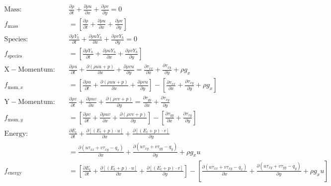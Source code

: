 \documentclass{homework}
\begin{document}
{\footnotesize \begin{align*}
    \mathrm{Mass:} \quad &\frac{\partial \rho}{\partial t} + \frac{\partial \rho u}{\partial x} + \frac{\partial \rho v}{\partial y} = 0 \\
    f_\mathrm{mass} &= \left[ \tfrac{\partial \rho}{\partial t} + \tfrac{\partial \rho u}{\partial x} + \tfrac{\partial \rho v}{\partial y} \right] \\
    \mathrm{Species:} \quad &\frac{\partial \rho Y_h}{\partial t} + \frac{\partial \rho u Y_h}{\partial x} + \frac{\partial \rho v Y_h}{\partial y} = 0 \\
    f_\mathrm{species} &= \left[ \tfrac{\partial \rho Y_h}{\partial t} + \tfrac{\partial \rho u Y_h}{\partial x} + \tfrac{\partial \rho v Y_h}{\partial y} \right] \\
    \mathrm{X-Momentum:} \quad &\frac{\partial \rho u}{\partial t} + \frac{\partial (\rho u u + p)}{\partial x} + \frac{\partial \rho v u}{\partial y} = \frac{ \partial \tau_{xx}}{\partial x} + \frac{ \partial \tau_{xy}}{\partial y} + \rho g_x \\
    f_{\mathrm{mom},x} &= \left[ \tfrac{\partial \rho u}{\partial t} + \tfrac{\partial (\rho u u + p)}{\partial x} + \tfrac{\partial \rho v u}{\partial y} \right] - \left[ \tfrac{ \partial \tau_{xx}}{\partial x} + \tfrac{ \partial \tau_{xy}}{\partial y} + \rho g_x \right] \\
    \mathrm{Y-Momentum:} \quad &\frac{\partial \rho v}{\partial t} + \frac{\partial \rho u v}{\partial x} + \frac{\partial (\rho v v + p)}{\partial y} = \frac{ \partial \tau_{yy}}{\partial x} + \frac{ \partial \tau_{xy}}{\partial y} \\
    f_{\mathrm{mom},y} &= \left[ \tfrac{\partial \rho v}{\partial t} + \tfrac{\partial \rho u v}{\partial x} + \tfrac{\partial (\rho v v + p)}{\partial y} \right] - \left[ \tfrac{ \partial \tau_{yy}}{\partial x} + \tfrac{ \partial \tau_{xy}}{\partial y} \right] \\
    \mathrm{Energy:} \quad &\frac{\partial E_t}{\partial t} + \frac{\partial [(E_t + p) \cdot u]}{\partial x} + \frac{\partial  [(E_t + p) \cdot v]}{\partial y} \\&= \frac{\partial (u\tau_{xx} + v \tau_{xy} - q_x)}{\partial x} + \frac{\partial (u\tau_{xy} + v \tau_{yy} - q_y)}{\partial y} + \rho g_x u \\
    f_\mathrm{energy} &= \left[ \tfrac{\partial E_t}{\partial t} + \tfrac{\partial [(E_t + p) \cdot u]}{\partial x} + \tfrac{\partial  [(E_t + p) \cdot v]}{\partial y} \right] -\left[ \tfrac{\partial (u\tau_{xx} + v \tau_{xy} - q_x)}{\partial x} + \tfrac{\partial (u\tau_{xy} + v \tau_{yy} - q_y)}{\partial y} + \rho g_x u \right]
\end{align*}}
\end{document}

